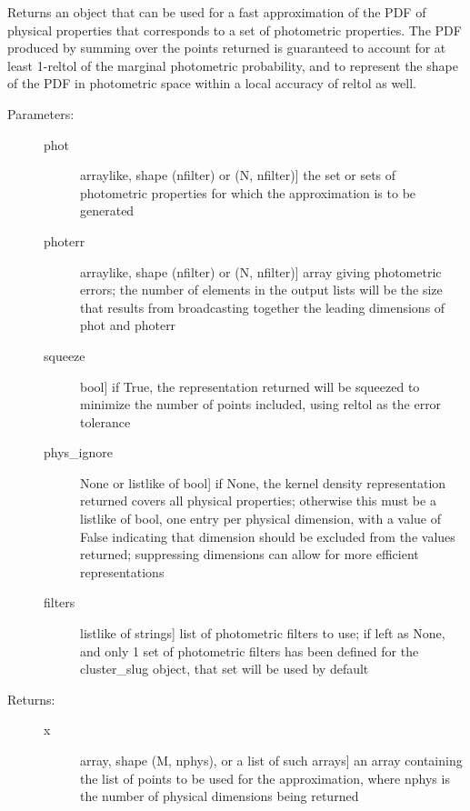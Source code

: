\documentclass[letterpaper,10pt,english]{sphinxmanual}
\begin{document}
\begin{fulllineitems}
\begin{fulllineitems}
\label{cluster_slug:slugpy.cluster_slug.cluster_slug.make_approx_phys}
Returns an object that can be used for a fast approximation of
the PDF of physical properties that corresponds to a set of
photometric properties. The PDF produced by summing over the
points returned is guaranteed to account for at least 1-reltol
of the marginal photometric probability, and to represent the
shape of the PDF in photometric space within a local accuracy
of reltol as well.
\begin{description}
\item[{Parameters:}] \leavevmode\begin{description}
\item[{phot}] \leavevmode{[}arraylike, shape (nfilter) or (N, nfilter){]}
the set or sets of photometric properties for which the
approximation is to be generated

\item[{photerr}] \leavevmode{[}arraylike, shape (nfilter) or (N, nfilter){]}
array giving photometric errors; the number of elements
in the output lists will be the size that results from
broadcasting together the leading dimensions of phot and
photerr

\item[{squeeze}] \leavevmode{[}bool{]}
if True, the representation returned will be squeezed to
minimize the number of points included, using reltol as
the error tolerance

\item[{phys\_ignore}] \leavevmode{[}None or listlike of bool{]}
if None, the kernel density representation returned
covers all physical properties; otherwise this must be a
listlike of bool, one entry per physical dimension, with
a value of False indicating that dimension should be
excluded from the values returned; suppressing
dimensions can allow for more efficient representations

\item[{filters}] \leavevmode{[}listlike of strings{]}
list of photometric filters to use; if left as None, and
only 1 set of photometric filters has been defined for
the cluster\_slug object, that set will be used by
default

\end{description}

\item[{Returns:}] \leavevmode\begin{description}
\item[{x}] \leavevmode{[}array, shape (M, nphys), or a list of such arrays{]}
an array containing the list of points to be used for
the approximation, where nphys is the number of
physical dimensions being returned


\end{description}
\end{description}
\end{fulllineitems}
\end{fulllineitems}
\end{document}
